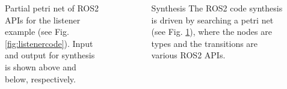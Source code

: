 \documentclass[final]{beamer}
\newlength{\sepwid}
\newlength{\onecolwid}
\newlength{\twocolwid}
\begin{document}
\begin{frame}[t]
\begin{columns}[t]
\begin{column}{\twocolwid}
\begin{columns}[t,totalwidth=\twocolwid]
\begin{column}{\onecolwid}
\begin{figure}

\caption{Partial petri net of ROS2 APIs for the listener example (see Fig. \ref{fig:listenercode}). Input and output for synthesis is shown above and below, respectively.}
\label{fig:petri}
\end{figure}





\end{column} %

\end{columns} %

\end{column} %

\begin{column}{\sepwid}\end{column} %

\begin{column}{\onecolwid} %

\begin{block}{Synthesis}
The ROS2 code synthesis is driven by searching a petri net (see Fig. \ref{fig:petri}), where the nodes are types and the transitions are various ROS2 APIs.

\end{block}



\end{column}
\end{columns}
\end{frame}
\end{document}
